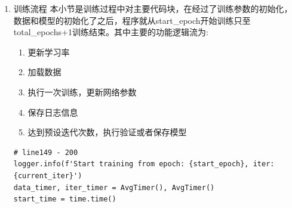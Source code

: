 \documentclass[../main.tex]{subfiles}
\begin{document}
\begin{enumerate}
\begin{enumerate}
\begin{verbatim}
\end{verbatim}


\item 训练流程
本小节是训练过程中对主要代码块，在经过了训练参数的初始化，数据和模型的初始化了之后，程序就从start\_epoch开始训练只至total\_epochs+1训练结束。其中主要的功能逻辑流为:

\begin{enumerate}
\item 更新学习率
\item 加载数据
\item 执行一次训练，更新网络参数
\item 保存日志信息
\item 达到预设迭代次数，执行验证或者保存模型
\end{enumerate}

\begin{verbatim}
# line149 - 200
logger.info(f'Start training from epoch: {start_epoch}, iter: {current_iter}')
data_timer, iter_timer = AvgTimer(), AvgTimer()
start_time = time.time()


\end{verbatim}
\end{enumerate}
\end{enumerate}
\end{document}
